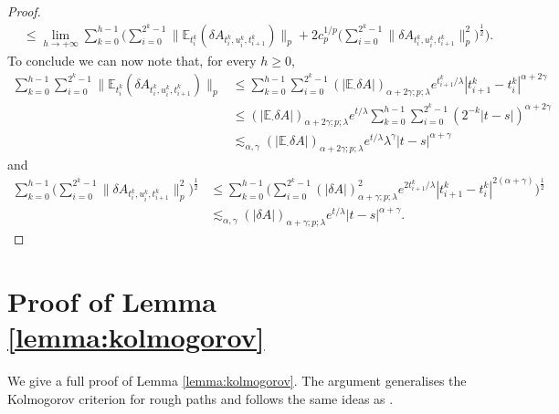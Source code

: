 \documentclass[11pt,a4paper]{article}
\newcommand{\E}{\mathbb{E}}
\theoremstyle{plain}
\begin{document}
\begin{appendices}
\begin{proof}
\begin{align*}
        &\le \lim_{h \to +\infty} \sum_{k=0}^{h-1} \Big(\sum_{i=0}^{2^k-1} \|\E_{t_i^k}(\delta A_{t_i^k,u_i^k,t_{i+1}^k})\|_p + 2c_p^{1/p}\big(\sum_{i=0}^{2^k-1} \|\delta A_{t_i^k,u_i^k,t_{i+1}^k}\|_p^2\big)^{\frac{1}{2}} \Big). 
\end{align*}
To conclude we can now note that, for every $h\ge 0$,\begin{align*}
        \sum_{k=0}^{h-1} \sum_{i=0}^{2^k-1} \|\E_{t_i^k}(\delta A_{t_i^k,u_i^k,t_{i+1}^k})\|_p &\le \sum_{k=0}^{h-1} \sum_{i=0}^{2^k-1} (|\E_\cdot\delta A|)_{\alpha+2\gamma;p;\lambda} e^{t_{i+1}^k/\lambda} |t_{i+1}^k-t_i^k|^{\alpha+2\gamma}  \\ 
        &\le (|\E_\cdot\delta A|)_{\alpha+2\gamma;p;\lambda}e^{t/\lambda} \sum_{k=0}^{h-1} \sum_{i=0}^{2^k-1} (2^{-k}|t-s|)^{\alpha+2\gamma} \\
        &\lesssim_{\alpha,\gamma} (|\E_\cdot\delta A|)_{\alpha+2\gamma;p;\lambda}e^{t/\lambda}\lambda^\gamma |t-s|^{\alpha+\gamma}  
    \end{align*}
and \begin{align*}
    \sum_{k=0}^{h-1} \big(\sum_{i=0}^{2^k-1} \|\delta A_{t_i^k,u_i^k,t_{i+1}^k}\|_p^2\big)^{\frac{1}{2}} 
    &\le \sum_{k=0}^{h-1} \big(\sum_{i=0}^{2^k-1} (|\delta A|)_{\alpha+\gamma;p;\lambda}^2 e^{2t_{i+1}^k/\lambda} |t_{i+1}^k-t_i^k|^{2(\alpha+\gamma)}\big)^{\frac{1}{2}} \\ 
    &\lesssim_{\alpha,\gamma} (|\delta A|)_{\alpha+\gamma;p;\lambda}e^{t/\lambda}|t-s|^{\alpha+\gamma}.  
\end{align*}
\end{proof}

\section{Proof of Lemma \ref{lemma:kolmogorov}} \label{appendixKolmogorov}

We give a full proof of Lemma \ref{lemma:kolmogorov}.
The argument generalises the Kolmogorov criterion for rough paths and follows the same ideas as \cite[Theorem 3.1]{FH20}. 


\end{appendices}
\end{document}

